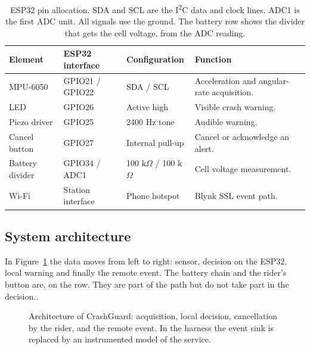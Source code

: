 \documentclass[10pt,a4paper]{article}
\begin{document}
\begin{table}[H]\centering\small\caption{ESP32 pin allocation. SDA and SCL are the I\textsuperscript{2}C data and clock lines. ADC1 is the first ADC unit. All signals use the ground. The battery row shows the divider that gets the cell voltage, from the ADC reading.}\label{tab:pins}
\begin{tabularx}{\linewidth}{|l|l|l|X|}\hline
\textbf{Element} & \textbf{ESP32 interface} & \textbf{Configuration} & \textbf{Function}\\\hline
MPU-6050 & GPIO21 / GPIO22 & SDA / SCL & Acceleration and angular-rate acquisition.\\\hline
LED & GPIO26 & Active high & Visible crash warning.\\\hline
Piezo driver & GPIO25 & 2400 Hz tone & Audible warning.\\\hline
Cancel button & GPIO27 & Internal pull-up & Cancel or acknowledge an alert.\\\hline
Battery divider & GPIO34 / ADC1 & 100 k$\Omega$ / 100 k$\Omega$ & Cell voltage measurement.\\\hline
Wi-Fi & Station interface & Phone hotspot & Blynk SSL event path.\\\hline
\end{tabularx}\end{table}

\subsection{System architecture}
In Figure~\ref{fig:arch} the data moves from left to right: sensor, decision on the ESP32, local warning and finally the remote event. The battery chain and the rider's button are, on the row. They are part of the path but do not take part in the decision..

\begin{figure}[H]\centering
{}
\caption{Architecture of CrashGuard: acquisition, local decision, cancellation by the rider, and the remote event. In the harness the event sink is replaced by an instrumented model of the service.}\label{fig:arch}
\end{figure}
\end{document}
